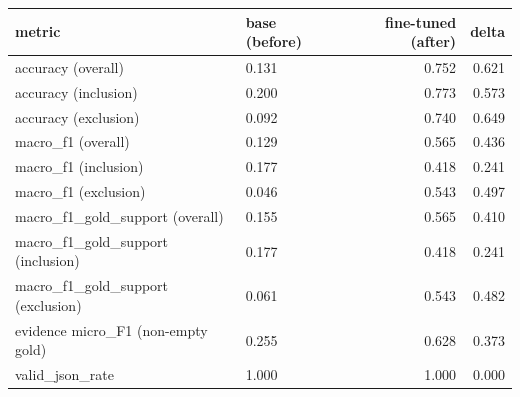 \begin{tabular}{llrr}
\toprule
metric & base (before) & fine-tuned (after) & delta \\
\midrule
accuracy (overall) & 0.131 & 0.752 & 0.621 \\
accuracy (inclusion) & 0.200 & 0.773 & 0.573 \\
accuracy (exclusion) & 0.092 & 0.740 & 0.649 \\
macro\_f1 (overall) & 0.129 & 0.565 & 0.436 \\
macro\_f1 (inclusion) & 0.177 & 0.418 & 0.241 \\
macro\_f1 (exclusion) & 0.046 & 0.543 & 0.497 \\
macro\_f1\_gold\_support (overall) & 0.155 & 0.565 & 0.410 \\
macro\_f1\_gold\_support (inclusion) & 0.177 & 0.418 & 0.241 \\
macro\_f1\_gold\_support (exclusion) & 0.061 & 0.543 & 0.482 \\
evidence micro\_F1 (non-empty gold) & 0.255 & 0.628 & 0.373 \\
valid\_json\_rate & 1.000 & 1.000 & 0.000 \\
\bottomrule
\end{tabular}
